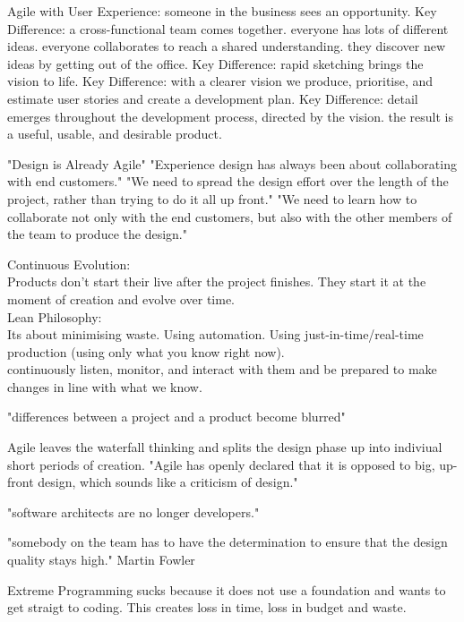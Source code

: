 Agile with User Experience:
someone in the business sees an opportunity.
Key Difference: a cross-functional team comes together.
everyone has lots of different ideas.
everyone collaborates to reach a shared understanding.
they discover new ideas by getting out of the office.
Key Difference: rapid sketching brings the vision to life.
Key Difference: with a clearer vision we produce, prioritise, and estimate user stories and create a development plan.
Key Difference: detail emerges throughout the development process, directed by the vision.
the result is a useful, usable, and desirable product.
\citep{ratcliffe2011agile:34:35}

"Design is Already Agile" 
"Experience design has always been about collaborating with end customers." 
"We need to spread the design effort over the length of the project, rather than trying to do it all up front."
"We need to learn how to collaborate not only with the end customers, but also with the other members of the team to produce the design."
\citep{ratcliffe2011agile:36}

Continuous Evolution:\\
Products don't start their live after the project finishes.
They start it at the moment of creation and evolve over time.\\
Lean Philosophy:\\
Its about minimising waste. Using automation. Using just-in-time/real-time production (using only what you know right now).\\
continuously listen, monitor, and interact with them and be prepared to make changes in line with what we know.
\citep{ratcliffe2011agile:37}

"differences between a project and a product become blurred" \citep{ratcliffe2011agile:38}

Agile leaves the waterfall thinking and splits the design phase up into indiviual short periods of creation.
"Agile has openly declared that it is opposed to big, up-front design, which sounds like a criticism of design." 
\citep{ratcliffe2011agile:43}

"software architects are no longer developers." \citep{ratcliffe2011agile:44}

"somebody on the team has to have the determination to ensure that the design quality stays high." Martin Fowler \citep{ratcliffe2011agile:45}

Extreme Programming sucks because it does not use a foundation and wants to get straigt to coding. This creates loss in time, loss in budget and waste.

